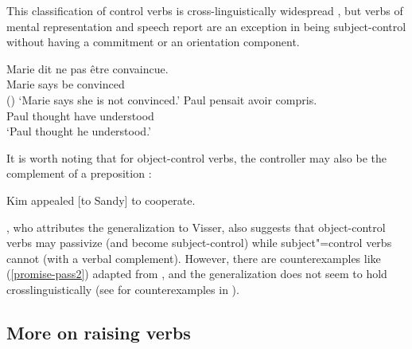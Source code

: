   This classification of control verbs is cross-linguistically widespread \citep{VanValinandLapolla1997}, but  verbs of mental representation and speech report are an exception in being subject-control without having a commitment or an orientation component.


\begin{exe}
\ex \begin{xlist}
\ex 
\gll Marie dit {ne pas} \^etre convaincue.\\
     Marie says  be convinced \\\hfill()
\glt `Marie says she is not convinced.'	
\ex 
\gll Paul pensait  avoir compris. \\
     Paul thought have understood \\
\glt `Paul thought he understood.'
 \end{xlist}
\end{exe}

It is worth noting that for object-control verbs, the controller may also be the complement of a preposition \citep[]{PollardandSag1994}:

\begin{exe}
\ex Kim appealed [to Sandy] to cooperate. \label{to}
\end{exe}


 
\citet[]{Bresnan1982}, who attributes the generalization to Visser, also suggests that
object-control verbs may passivize (and become subject-control) while subject"=control verbs cannot
(with a verbal complement). However, there are counterexamples like (\ref{promise-pass2}) adapted
from \citet[]{JB1976a-u}, and the generalization does not seem to hold crosslinguistically
(see \citealt[]{Mueller2002b} for counterexamples in ).

\eal
{}\label{persuade-pass}
\label{promise-pass}
\label{promise-pass2}
\zl

 
\subsection{More on raising verbs}
\label{sec-more-on-raising-verbs}


